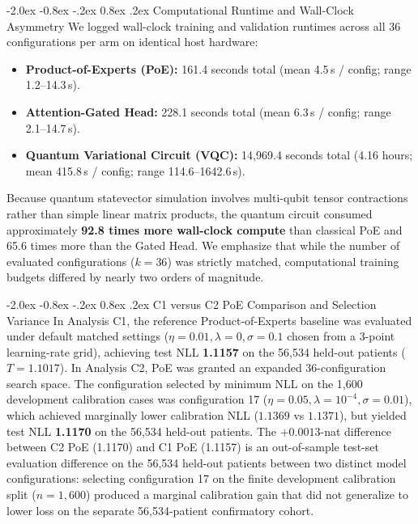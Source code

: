 \documentclass[10pt,a4paper]{article}
\makeatletter
\renewcommand{\subsection}{\@startsection{subsection}{2}{\z@}%
  {-2.0ex \@plus -0.8ex \@minus -.2ex}%
  {0.8ex \@plus.2ex}%
  {\normalfont\large\sffamily\bfseries\color{naturedark}}}
\makeatother
\begin{document}
\subsection{Computational Runtime and Wall-Clock Asymmetry}
We logged wall-clock training and validation runtimes across all 36 configurations per arm on identical host hardware:
\begin{itemize}
  \item \textbf{Product-of-Experts (PoE):} 161.4 seconds total (mean 4.5\,s / config; range 1.2--14.3\,s).
  \item \textbf{Attention-Gated Head:} 228.1 seconds total (mean 6.3\,s / config; range 2.1--14.7\,s).
  \item \textbf{Quantum Variational Circuit (VQC):} 14,969.4 seconds total (4.16 hours; mean 415.8\,s / config; range 114.6--1642.6\,s).
\end{itemize}
Because quantum statevector simulation involves multi-qubit tensor contractions rather than simple linear matrix products, the quantum circuit consumed approximately \textbf{92.8 times more wall-clock compute} than classical PoE and 65.6 times more than the Gated Head. We emphasize that while the number of evaluated configurations ($k=36$) was strictly matched, computational training budgets differed by nearly two orders of magnitude.

\subsection{C1 versus C2 PoE Comparison and Selection Variance}
In Analysis C1, the reference Product-of-Experts baseline was evaluated under default matched settings ($\eta=0.01, \lambda=0, \sigma=0.1$ chosen from a 3-point learning-rate grid), achieving test NLL \textbf{1.1157} on the 56,534 held-out patients ($T=1.1017$). In Analysis C2, PoE was granted an expanded 36-configuration search space. The configuration selected by minimum NLL on the 1,600 development calibration cases was configuration 17 ($\eta=0.05, \lambda=10^{-4}, \sigma=0.01$), which achieved marginally lower calibration NLL ($1.1369$ vs $1.1371$), but yielded test NLL \textbf{1.1170} on the 56,534 held-out patients. The $+0.0013$-nat difference between C2 PoE (1.1170) and C1 PoE (1.1157) is an out-of-sample test-set evaluation difference on the 56,534 held-out patients between two distinct model configurations: selecting configuration 17 on the finite development calibration split ($n=1,600$) produced a marginal calibration gain that did not generalize to lower loss on the separate 56,534-patient confirmatory cohort.
\end{document}
